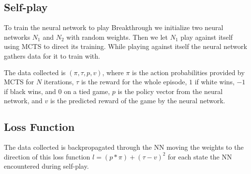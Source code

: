 \subsection{Self-play}

To train the neural network to play Breakthrough we initialize two neural networks $N_1$ and $N_2$ 
with random weights. Then we let $N_1$ play against itself using MCTS to direct its training. 
While playing against itself the neural network gathers data for it to train with. 

The data collected is $(\pi, \tau, p, v)$, where $\pi$ is the action probabilities provided by 
MCTS for $N$ iterations, $\tau$ is the reward for the whole episode, $1$ if white wins,
$-1$ if black wins, and $0$ on a tied game, $p$ is the policy vector
from the neural network, and $v$ is the predicted reward of the game by the neural network.

\subsection{Loss Function}

The data collected is backpropagated through the NN moving the weights to the direction of this 
loss function $l = (p * \pi) + (\tau - v)^2$ for each state the NN encountered during self-play.
